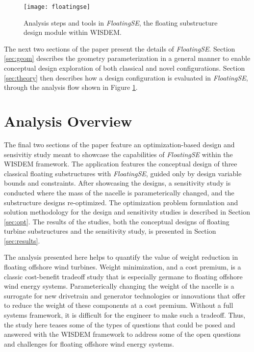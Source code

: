 \begin{figure}[htbp]
  \begin{center}
    \texttt{[image: floatingse]}\\
    \caption{Analysis steps and tools in \textit{FloatingSE}, the floating substructure design module within WISDEM.}
    \label{fig:floatingse}
  \end{center}
\end{figure}

The next two sections of the paper present the details of
\textit{FloatingSE}.  Section \ref{sec:geom} describes the geometry
parameterization in a general manner to enable conceptual design
exploration of both classical and novel configurations.  Section
\ref{sec:theory} then describes how a design configuration is evaluated
in \textit{FloatingSE}, through the analysis flow shown in Figure
\ref{fig:floatingse}.

\section{Analysis Overview}
The final two sections of the paper feature an optimization-based design
and sensivitiy study meant to showcase the capabilities of
\textit{FloatingSE} within the WISDEM framework.  The application
features the conceptual design of three classical floating substructures
with \textit{FloatingSE}, guided only by design variable bounds and
constraints.  After showcasing the designs, a sensitivity study is
conducted where the mass of the nacelle is parameterically changed, and
the substructure designs re-optimized.  The optimization problem
formulation and solution methodology for the design and sensitivity
studies is described in Section \ref{sec:opt}.  The results of the
studies, both the conceptual designs of floating turbine substructures
and the sensitivity study, is presented in Section \ref{sec:results}.

The analysis presented here helps to quantify
the value of weight reduction in floating offshore wind turbines.
Weight minimization, and a cost premium, is a classic cost-benefit
tradeoff study that is especially germane to floating offshore wind
energy systems.  Parameterically changing the weight of the nacelle is a
surrogate for new drivetrain and generator technologies or innovations
that offer to reduce the weight of these components at a cost premium.
Without a full systems framework, it is difficult for the engineer to
make such a tradeoff.  Thus, the study here teases some of the types of
questions that could be posed and answered with the WISDEM framework to
address some of the open questions and challenges for floating offshore
wind energy systems.
